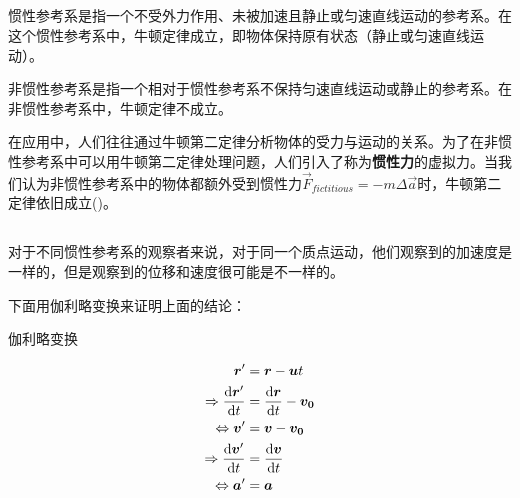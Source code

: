 \subsection[惯性参考系与非惯性参考系]{}
\begin{Itemize}
    \item 惯性参考系是指一个不受外力作用、未被加速且静止或匀速直线运动的参考系。在这个惯性参考系中，牛顿定律成立，即物体保持原有状态（静止或匀速直线运动）。
    \item 非惯性参考系是指一个相对于惯性参考系不保持匀速直线运动或静止的参考系。在非惯性参考系中，牛顿定律不成立\footnotemark。
\end{Itemize}

在应用中，人们往往通过牛顿第二定律分析物体的受力与运动的关系。为了在非惯性参考系中可以用牛顿第二定律处理问题，人们引入了称为\textbf{惯性力}的虚拟力。当我们认为非惯性参考系中的物体都额外受到惯性力$\vec{F}_{fictitious}=-m\Delta\vec{a}$时，牛顿第二定律依旧成立()。


\subsection[惯性系中的相对运动]{}
对于不同惯性参考系的观察者来说，对于同一个质点运动，他们观察到的加速度是一样的，但是观察到的位移和速度很可能是不一样的。

下面用伽利略变换来证明上面的结论：
\begin{center}
    伽利略变换
\end{center}
\begin{equation}
    \begin{aligned}
        \vec{r}'                                 & =\vec{r}-\vec{u}t                        \\
        \Rightarrow \frac{\dif \vec{r}'}{\dif t} & =\frac{\dif \vec{r}}{\dif t}-\vec{v_{0}} \\
        \Leftrightarrow \vec{v}'                 & =\vec{v}-\vec{v_{0}}                     \\
        \Rightarrow \frac{\dif \vec{v}'}{\dif t} & =\frac{\dif \vec{v}}{\dif t}             \\
        \Leftrightarrow \vec{a}'                 & =\vec{a}
    \end{aligned}
    \nonumber
\end{equation}

